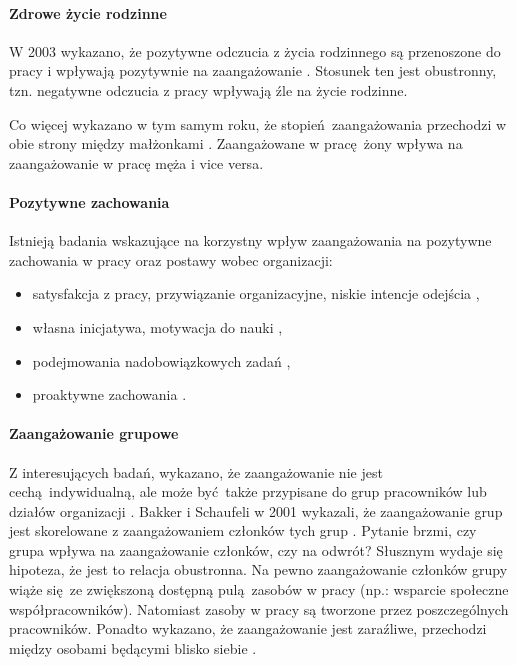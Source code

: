 \paragraph{Zdrowe życie rodzinne}
W 2003 wykazano, że pozytywne odczucia z życia rodzinnego są przenoszone do pracy i wpływają pozytywnie na zaangażowanie \cite{montgomery2003work}. Stosunek ten jest obustronny, tzn. negatywne odczucia z pracy wpływają źle na życie rodzinne. 

Co więcej wykazano w tym samym roku, że stopień zaangażowania przechodzi w obie strony między małżonkami \cite{bakker2003crossover}. Zaangażowane w pracę żony wpływa na zaangażowanie w pracę męża i vice versa.
\paragraph{Pozytywne zachowania}
Istnieją badania wskazujące na korzystny wpływ zaangażowania na pozytywne zachowania w pracy oraz postawy wobec organizacji:
\begin{itemize}
  \item satysfakcja z pracy, przywiązanie organizacyjne, niskie intencje odejścia \cite{demerouti2001job,salanova2000burnout,schaufeli2008workaholism},
  \item własna inicjatywa, motywacja do nauki \cite{sonnentag2003recovery},
  \item podejmowania nadobowiązkowych zadań \cite{salanova2005linking},
  \item proaktywne zachowania \cite{salanova2003perceived}.
\end{itemize}
\paragraph{Zaangażowanie grupowe}
Z interesujących badań, wykazano, że zaangażowanie nie jest cechą indywidualną, ale może być także przypisane do grup pracowników lub działów organizacji \cite{salanova2005linking,bakker2003multigroup}. Bakker i Schaufeli w 2001 wykazali, że zaangażowanie grup jest skorelowane z zaangażowaniem członków tych grup \cite{bakker2001burnout}. Pytanie brzmi, czy grupa wpływa na zaangażowanie członków, czy na odwrót? Słusznym wydaje się hipoteza, że jest to relacja
obustronna. Na pewno zaangażowanie członków grupy wiąże się ze zwiększoną dostępną pulą zasobów w pracy (np.: wsparcie społeczne współpracowników). Natomiast zasoby w pracy są tworzone przez poszczególnych pracowników. Ponadto wykazano, że zaangażowanie jest zaraźliwe, przechodzi między osobami będącymi blisko siebie \cite{bakker2003crossover}.

